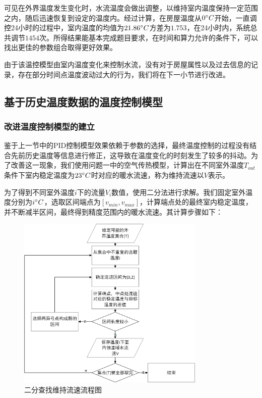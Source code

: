 \documentclass{my_paper}
\begin{document}
可见在外界温度发生变化时，水流温度会做出调整，以维持室内温度保持一定范围之内，随后迅速恢复到设定的温度内。经过计算，在房屋温度从$0\degree C$开始，一直调控24小时的过程中，室内温度的均值为$21.86\degree C$方差为$1.753$，在24小时内，系统总共调节$1454$次。所得结果能基本完成题目要求，在时间和算力允许的条件下，可以找出更佳的参数组合取得更好效果。

由于该温控模型由室内温度变化来控制水流，没有对于房屋属性以及过去信息的记录，存在部分时间点温度波动过大的行为，我们将在下一小节进行改进。

\subsection{基于历史温度数据的温度控制模型}

\subsubsection{改进温度控制模型的建立}
鉴于上一节中的PID控制模型效果依赖于参数的选择，最终温度控制的过程没有结合先前历史温度等信息进行修正，这导致在温度变化的时刻发生了较多的抖动。为了改善这一现象，我们使用问题一中的空气传热模型，计算出在不同室外温度$T_{out}$条件下室内稳定温度为$23\degree C$时对应的暖水流速，称为维持流速以$V$表示。

为了得到不同室外温度$i$下的流量$V_i$数值，使用二分法进行求解。我们固定室外温度分别为$i\degree C$，选取区间端点为$[v_{min},v_{max}]$，计算端点处的最终室内稳定温度，并不断减半区间，最终得到精度范围内的暖水流速。其计算步骤如下：

\begin {figure}[h]
\centering %
\includegraphics[width=0.8\textwidth]{kt.png}
\caption{二分查找维持流速流程图} %
\label{five}
\end {figure}
\end{document}
